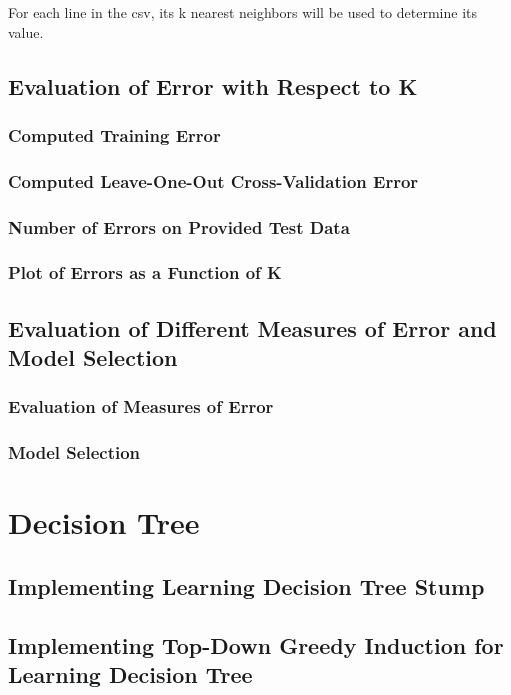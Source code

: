 \documentclass[letterpaper,10pt]{article}
\begin{document}
For each line in the csv, its k nearest neighbors will be used to determine its value.\\

\subsection{Evaluation of Error with Respect to K}
\subsubsection{Computed Training Error}
\subsubsection{Computed Leave-One-Out Cross-Validation Error}
\subsubsection{Number of Errors on Provided Test Data}
\subsubsection{Plot of Errors as a Function of K}

\subsection{Evaluation of Different Measures of Error and Model Selection}
\subsubsection{Evaluation of Measures of Error}
\subsubsection{Model Selection}

\section{Decision Tree}
\subsection{Implementing Learning Decision Tree Stump}
\subsection{Implementing Top-Down Greedy Induction for Learning Decision Tree}
\end{document}
